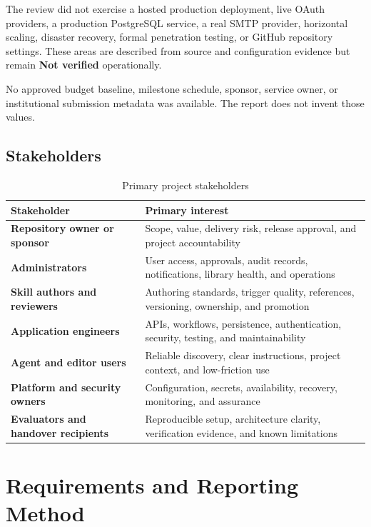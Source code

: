 \documentclass[12pt]{report}
\newcommand{\notverified}{\textbf{Not verified}}
\begin{document}
The review did not exercise a hosted production deployment, live OAuth providers, a production PostgreSQL service, a real SMTP provider, horizontal scaling, disaster recovery, formal penetration testing, or GitHub repository settings. These areas are described from source and configuration evidence but remain \notverified{} operationally.

No approved budget baseline, milestone schedule, sponsor, service owner, or institutional submission metadata was available. The report does not invent those values.

\section{Stakeholders}

\begin{table}[hbt!]
\centering
\small
\begin{tabularx}{\textwidth}{>{\bfseries}p{}X}
\toprule
Stakeholder & Primary interest \\
\midrule
Repository owner or sponsor & Scope, value, delivery risk, release approval, and project accountability \\
Administrators & User access, approvals, audit records, notifications, library health, and operations \\
Skill authors and reviewers & Authoring standards, trigger quality, references, versioning, ownership, and promotion \\
Application engineers & APIs, workflows, persistence, authentication, security, testing, and maintainability \\
Agent and editor users & Reliable discovery, clear instructions, project context, and low-friction use \\
Platform and security owners & Configuration, secrets, availability, recovery, monitoring, and assurance \\
Evaluators and handover recipients & Reproducible setup, architecture clarity, verification evidence, and known limitations \\
\bottomrule
\end{tabularx}
\caption{Primary project stakeholders}
\label{tab:stakeholders}
\end{table}

\chapter{Requirements and Reporting Method}
\end{document}
